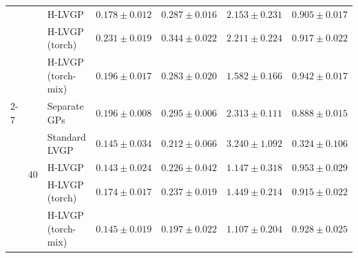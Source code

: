 \begin{table}[htbp]
\begin{tabular}{lllrrrr}
 &  & H-LVGP & $0.178 \pm 0.012$ & $0.287 \pm 0.016$ & $2.153 \pm 0.231$ & $0.905 \pm 0.017$ \\
 &  & H-LVGP (torch) & $0.231 \pm 0.019$ & $0.344 \pm 0.022$ & $2.211 \pm 0.224$ & $0.917 \pm 0.022$ \\
 &  & H-LVGP (torch-mix) & $0.196 \pm 0.017$ & $0.283 \pm 0.020$ & \colorbox{green!20}{\boldmath$1.582 \pm 0.166$} & $0.942 \pm 0.017$ \\
\cmidrule(lr){2-7}
 & \multirow{5}{*}{40} & Separate GPs & $0.196 \pm 0.008$ & $0.295 \pm 0.006$ & $2.313 \pm 0.111$ & $0.888 \pm 0.015$ \\
 &  & Standard LVGP & $0.145 \pm 0.034$ & $0.212 \pm 0.066$ & $3.240 \pm 1.092$ & $0.324 \pm 0.106$ \\
 &  & H-LVGP & \colorbox{green!20}{\boldmath$0.143 \pm 0.024$} & $0.226 \pm 0.042$ & $1.147 \pm 0.318$ & \colorbox{green!20}{\boldmath$0.953 \pm 0.029$} \\
 &  & H-LVGP (torch) & $0.174 \pm 0.017$ & $0.237 \pm 0.019$ & $1.449 \pm 0.214$ & $0.915 \pm 0.022$ \\
 &  & H-LVGP (torch-mix) & $0.145 \pm 0.019$ & \colorbox{green!20}{\boldmath$0.197 \pm 0.022$} & \colorbox{green!20}{\boldmath$1.107 \pm 0.204$} & $0.928 \pm 0.025$ \\
\bottomrule
\end{tabular}
\end{table}
